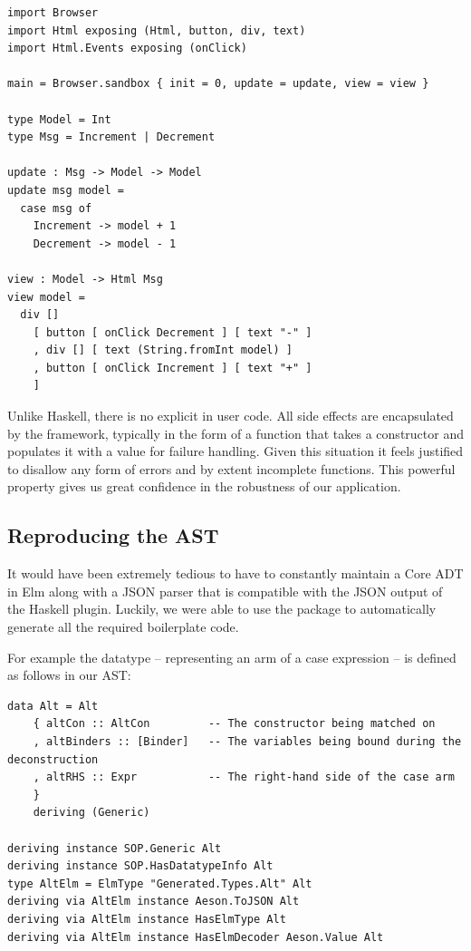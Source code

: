 \begin{listing}[H]
\begin{verbatim}
import Browser
import Html exposing (Html, button, div, text)
import Html.Events exposing (onClick)

main = Browser.sandbox { init = 0, update = update, view = view }

type Model = Int
type Msg = Increment | Decrement

update : Msg -> Model -> Model
update msg model =
  case msg of
    Increment -> model + 1
    Decrement -> model - 1

view : Model -> Html Msg
view model =
  div []
    [ button [ onClick Decrement ] [ text "-" ]
    , div [] [ text (String.fromInt model) ]
    , button [ onClick Increment ] [ text "+" ]
    ]
\end{verbatim}
\end{listing}

Unlike Haskell, there is no explicit  in user code. All side effects are encapsulated by the framework, typically in the form of a function
that takes a  constructor and populates it with a  value for failure handling.
Given this situation it feels justified to disallow any form of errors and by extent incomplete functions.
This powerful property gives us great confidence in the robustness of our application.

\subsection{Reproducing the AST}

It would have been extremely tedious to have to constantly maintain a Core ADT in Elm along with a JSON
parser that is compatible with the JSON output of the Haskell plugin. Luckily, we were able to use the
 \cite{haskell_to_elm} package to automatically generate all the required boilerplate code.

For example the  datatype --  representing an arm of a case expression -- is defined as follows in our AST:

\begin{listing}[H]
\begin{verbatim}
data Alt = Alt
    { altCon :: AltCon         -- The constructor being matched on
    , altBinders :: [Binder]   -- The variables being bound during the deconstruction
    , altRHS :: Expr           -- The right-hand side of the case arm
    }
    deriving (Generic)

deriving instance SOP.Generic Alt
deriving instance SOP.HasDatatypeInfo Alt
type AltElm = ElmType "Generated.Types.Alt" Alt
deriving via AltElm instance Aeson.ToJSON Alt
deriving via AltElm instance HasElmType Alt
deriving via AltElm instance HasElmDecoder Aeson.Value Alt
\end{verbatim}
\end{listing}

